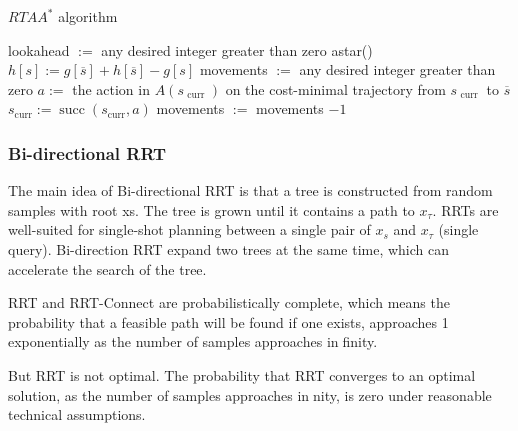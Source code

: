 \documentclass{article} %
\begin{document}
\begin{algorithm}[H]
    \caption{$RTAA^*$ algorithm}\label{RTAA}
    \begin{algorithmic}[1]
    
        \State lookahead $:=$ any desired integer greater than zero
        \State astar()
        \EndIf
            \State $h[s] :=g[\overline{s}]+h[\overline{s}]-g[s]$
        \EndFor
        \State movements $:=$ any desired integer greater than zero
            \State $a :=$ the action in $A\left(s_{\text { curr }}\right)$ on the cost-minimal trajectory from $s_{\text { curr }}$ to $\overline{s}$
            \State $s_{\mathrm{curr}} :=\operatorname{succ}\left(s_{\mathrm{curr}}, a\right)$
            \State movements $:=$ movements $-1$
        \EndWhile
        \EndWhile
    \EndProcedure
    \end{algorithmic}
\end{algorithm}

\subsubsection{Bi-directional RRT}

The main idea of Bi-directional RRT is that a tree is constructed from random samples with root xs. The tree is grown until it contains a path to $x_{\tau}$. RRTs are well-suited for
single-shot planning between a single pair of $x_s$ and $x_{\tau}$ (single query). Bi-direction RRT expand two trees at the same time, which can accelerate the search of the tree. 


RRT and RRT-Connect are probabilistically complete, which means the probability that a feasible path will be found if one exists, approaches 1 exponentially as the number of samples approaches infinity.

But RRT is not optimal. The probability that RRT converges to an optimal
solution, as the number of samples approaches innity, is zero under
reasonable technical assumptions.
\end{document}
